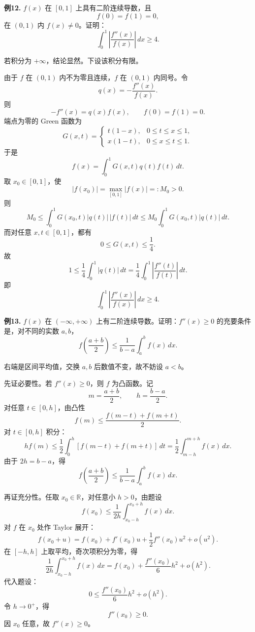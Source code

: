 \begin{problemblock}
\textbf{例12.} \(f(x)\) 在 \([0,1]\) 上具有二阶连续导数，且
\[
f(0)=f(1)=0,
\]
在 \((0,1)\) 内 \(f(x)\ne0\)。证明：
\[
\int_0^1\left|\frac{f''(x)}{f(x)}\right|\,dx\ge4.
\]
\end{problemblock}
\begin{solutionblock}
若积分为 \(+\infty\)，结论显然。下设该积分有限。

由于 \(f\) 在 \((0,1)\) 内不为零且连续，\(f\) 在 \((0,1)\) 内同号。令
\[
q(x)=-\frac{f''(x)}{f(x)}.
\]
则
\[
-f''(x)=q(x)f(x),\qquad f(0)=f(1)=0.
\]
端点为零的 Green 函数为
\[
G(x,t)=
\begin{cases}
t(1-x),&0\le t\le x\le1,\\
x(1-t),&0\le x\le t\le1.
\end{cases}
\]
于是
\[
f(x)=\int_0^1G(x,t)q(t)f(t)\,dt.
\]
取 \(x_0\in[0,1]\)，使
\[
|f(x_0)|=\max_{[0,1]}|f(x)|=:M_0>0.
\]
则
\[
M_0
\le\int_0^1G(x_0,t)|q(t)|\,|f(t)|\,dt
\le M_0\int_0^1G(x_0,t)|q(t)|\,dt.
\]
而对任意 \(x,t\in[0,1]\)，都有
\[
0\le G(x,t)\le\frac14.
\]
故
\[
1\le\frac14\int_0^1|q(t)|\,dt
=\frac14\int_0^1\left|\frac{f''(t)}{f(t)}\right|\,dt.
\]
即
\[
\int_0^1\left|\frac{f''(x)}{f(x)}\right|\,dx\ge4.
\]
\end{solutionblock}

\begin{problemblock}
\textbf{例13.} \(f(x)\) 在 \((-\infty,+\infty)\) 上有二阶连续导数。证明：\(f''(x)\ge0\) 的充要条件是，对不同的实数 \(a,b\)，
\[
f\left(\frac{a+b}{2}\right)
\le
\frac1{b-a}\int_a^b f(x)\,dx.
\]
\end{problemblock}
\begin{solutionblock}
右端是区间平均值，交换 \(a,b\) 后数值不变，故不妨设 \(a<b\)。

先证必要性。若 \(f''(x)\ge0\)，则 \(f\) 为凸函数。记
\[
m=\frac{a+b}{2},\qquad h=\frac{b-a}{2}.
\]
对任意 \(t\in[0,h]\)，由凸性
\[
f(m)\le\frac{f(m-t)+f(m+t)}2.
\]
对 \(t\in[0,h]\) 积分：
\[
h f(m)\le\frac12\int_0^h[f(m-t)+f(m+t)]\,dt
=\frac12\int_{m-h}^{m+h}f(x)\,dx.
\]
由于 \(2h=b-a\)，得
\[
f\left(\frac{a+b}{2}\right)
\le
\frac1{b-a}\int_a^b f(x)\,dx.
\]

再证充分性。任取 \(x_0\in\mathbb{R}\)，对任意小 \(h>0\)，由题设
\[
f(x_0)\le \frac1{2h}\int_{x_0-h}^{x_0+h}f(x)\,dx.
\]
对 \(f\) 在 \(x_0\) 处作 Taylor 展开：
\[
f(x_0+u)=f(x_0)+f'(x_0)u+\frac12f''(x_0)u^2+o(u^2).
\]
在 \([-h,h]\) 上取平均，奇次项积分为零，得
\[
\frac1{2h}\int_{x_0-h}^{x_0+h}f(x)\,dx
=f(x_0)+\frac{f''(x_0)}6h^2+o(h^2).
\]
代入题设：
\[
0\le \frac{f''(x_0)}6h^2+o(h^2).
\]
令 \(h\to0^+\)，得
\[
f''(x_0)\ge0.
\]
因 \(x_0\) 任意，故 \(f''(x)\ge0\)。
\end{solutionblock}

